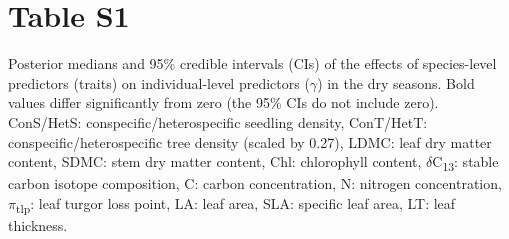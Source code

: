 \documentclass[
  12pt,
  letterpaper,
  DIV=11,
  numbers=noendperiod]{scrartcl}
\author{}
\date{}
\begin{document}
\ifdefined\Shaded\renewenvironment{Shaded}{\begin{tcolorbox}[enhanced, borderline west={3pt}{0pt}{shadecolor}, breakable, interior hidden, boxrule=0pt, sharp corners, frame hidden]}{\end{tcolorbox}}\fi

\hypertarget{table-s1}{%
\section{Table S1}\label{table-s1}}

Posterior medians and 95\% credible intervals (CIs) of the effects of
species-level predictors (traits) on individual-level predictors
(\(\gamma\)) in the dry seasons. Bold values differ significantly from
zero (the 95\% CIs do not include zero). ConS/HetS:
conspecific/heterospecific seedling density, ConT/HetT:
conspecific/heterospecific tree density (scaled by 0.27), LDMC: leaf dry
matter content, SDMC: stem dry matter content, Chl: chlorophyll content,
\(\delta\)C\textsubscript{13}: stable carbon isotope composition, C:
carbon concentration, N: nitrogen concentration,
\(\pi\)\textsubscript{tlp}: leaf turgor loss point, LA: leaf area, SLA:
specific leaf area, LT: leaf thickness.
\end{document}
